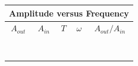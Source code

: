 \begin{table}[htb]
\begin{center}
\begin{tabular}{|c|c|c|c|c|}
\hline
\multicolumn{5}{|c|}{Amplitude versus Frequency}\\
\hline 
$A_{out}$ & $A_{in}$ & $T$ & $\omega$ & $A_{out}/A_{in}$ \\
\hline
\hspace*{2.5cm} & \hspace*{2.5cm} & \hspace*{2.5cm} & \hspace*{2.5cm} &
\hspace*{2.5cm} \\
\hspace*{2.5cm} & \hspace*{2.5cm} & \hspace*{2.5cm} & \hspace*{2.5cm} &
\hspace*{2.5cm} \\


\hline       
\hspace*{2.5cm} & \hspace*{2.5cm} & \hspace*{2.5cm} & \hspace*{2.5cm} &
\hspace*{2.5cm} \\
\hspace*{2.5cm} & \hspace*{2.5cm} & \hspace*{2.5cm} & \hspace*{2.5cm} &
\hspace*{2.5cm} \\ 


\hline       
\hspace*{2.5cm} & \hspace*{2.5cm} & \hspace*{2.5cm} & \hspace*{2.5cm} &
\hspace*{2.5cm} \\
\hspace*{2.5cm} & \hspace*{2.5cm} & \hspace*{2.5cm} & \hspace*{2.5cm} &
\hspace*{2.5cm} \\


\hline       
\hspace*{2.5cm} & \hspace*{2.5cm} & \hspace*{2.5cm} & \hspace*{2.5cm} &
\hspace*{2.5cm} \\
\hspace*{2.5cm} & \hspace*{2.5cm} & \hspace*{2.5cm} & \hspace*{2.5cm} &
\hspace*{2.5cm} \\



\end{tabular}
\end{center}
\end{table}
